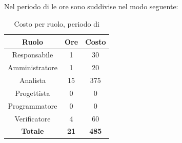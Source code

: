 \subsection{\AD}
Nel periodo di \AD{} le ore sono suddivise nel modo seguente:
\begin{table}[H]
	\centering
	\begin{tabular}{|c|c|c|}
		\hline
		\textbf{Ruolo} &
		\textbf{Ore} &
		\textbf{Costo} \\
		\hline
		Responsabile & 1 & 30\\
		\hline
		Amministratore & 1 & 20\\
		\hline
		Analista & 15 & 375\\
		\hline
		Progettista & 0 & 0 \\
		\hline
		Programmatore & 0 & 0 \\
		\hline
		Verificatore & 4 & 60\\
		\hline
		\textbf{Totale} & \textbf{21} & \textbf{485} \\
		\hline
	\end{tabular}
	\caption{Costo per ruolo, periodo di \AD}
\end{table}

